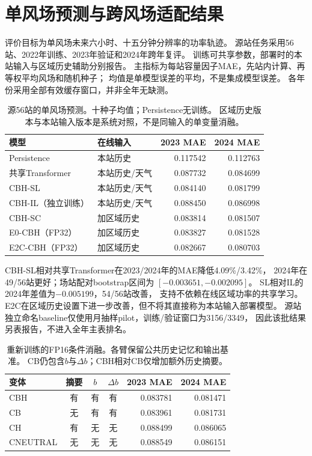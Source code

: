 \section{单风场预测与跨风场适配结果}
\label{sec:single-farm-review}

评价目标为单风场未来六小时、十五分钟分辨率的功率轨迹。
源站任务采用56站、2022年训练、2023年验证和2024年跨年复评。
训练可共享参数，部署时的本站输入与区域历史辅助分别报告。
主指标为每站容量因子MAE，先站内计算、再等权平均风场和随机种子；
均值是单模型误差的平均，不是集成模型误差。
各年份采用全部有效缓存窗口，并非全年无缺测。

\begin{table}[tbp]
\centering\small
\caption{源56站的单风场预测。十种子均值；Persistence无训练。
区域历史版本与本站输入版本是系统对照，不是同输入的单变量消融。}
\begin{tabular}{llrr}
\toprule
模型 & 在线输入 & 2023 MAE & 2024 MAE\\
\midrule
Persistence & 本站历史 & 0.117542 & 0.112763\\
共享Transformer & 本站历史/天气 & 0.087732 & 0.084699\\
CBH-SL & 本站历史/天气 & 0.084140 & 0.081799\\
CBH-IL（独立训练） & 本站历史/天气 & 0.088450 & 0.086998\\
\midrule
CBH-SC & 加区域历史 & 0.083814 & 0.081507\\
E0-CBH（FP32） & 加区域历史 & 0.083827 & 0.081528\\
E2C-CBH（FP32） & 加区域历史 & 0.082667 & 0.080703\\
\bottomrule
\end{tabular}
\end{table}

CBH-SL相对共享Transformer在2023/2024年的MAE降低4.09\%/3.42\%，
2024年在49/56站更好；场站配对bootstrap区间为
$[-0.003651,-0.002095]$。
SL相对IL的2024年差值为$-0.005199$，54/56站改善，
支持不依赖在线区域功率的共享学习。
E2C在区域历史设置下进一步改善，但不将其直接称为本站输入部署模型。
源站独立命名baseline仅使用月抽样pilot，训练/验证窗口为3156/3349，
因此该批结果另表报告，不进入全年主表排名。

\begin{table}[tbp]
\centering\small
\caption{重新训练的FP16条件消融。各臂保留公共历史记忆和输出基准。
CB仍包含$b$与$\Delta b$；CBH相对CB仅增加额外历史摘要。}
\begin{tabular}{lccc rr}
\toprule
变体 & 摘要 & $b$ & $\Delta b$ & 2023 MAE & 2024 MAE\\
\midrule
CBH & 有 & 有 & 有 & 0.083781 & 0.081471\\
CB & 无 & 有 & 有 & 0.083961 & 0.081731\\
CH & 有 & 无 & 无 & 0.088499 & 0.086065\\
CNEUTRAL & 无 & 无 & 无 & 0.088549 & 0.086151\\
\bottomrule
\end{tabular}
\end{table}

